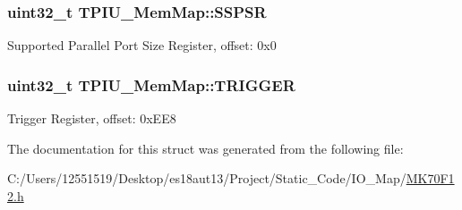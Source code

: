 \subsubsection[{S\+S\+P\+S\+R}]{\setlength{\rightskip}{0pt plus 5cm}uint32\+\_\+t T\+P\+I\+U\+\_\+\+Mem\+Map\+::\+S\+S\+P\+S\+R}\label{struct_t_p_i_u___mem_map_a3570cf26e2ddc1d5700776743b0506e3}
Supported Parallel Port Size Register, offset\+: 0x0 \hypertarget{struct_t_p_i_u___mem_map_a267271b4e2d7ad48cba1614440c741fb}{}
\subsubsection[{T\+R\+I\+G\+G\+E\+R}]{\setlength{\rightskip}{0pt plus 5cm}uint32\+\_\+t T\+P\+I\+U\+\_\+\+Mem\+Map\+::\+T\+R\+I\+G\+G\+E\+R}\label{struct_t_p_i_u___mem_map_a267271b4e2d7ad48cba1614440c741fb}
Trigger Register, offset\+: 0x\+E\+E8 

The documentation for this struct was generated from the following file\+:\begin{DoxyCompactItemize}
\item 
C\+:/\+Users/12551519/\+Desktop/es18aut13/\+Project/\+Static\+\_\+\+Code/\+I\+O\+\_\+\+Map/\hyperlink{_m_k70_f12_8h}{M\+K70\+F12.\+h}\end{DoxyCompactItemize}
